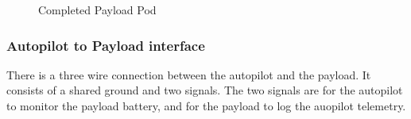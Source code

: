 \documentclass[a4paper,11pt]{report}
\begin{document}
\begin{figure}[ht]
  \centering
 \caption{Completed Payload Pod}
 \label{fig:payload}
\end{figure}

\subsubsection{Autopilot to Payload interface}

There is a three wire connection between the autopilot and the payload. It consists of a shared ground and two signals. The two signals are for the autopilot to monitor the payload battery, and for the payload to log the auopilot telemetry.
\end{document}
